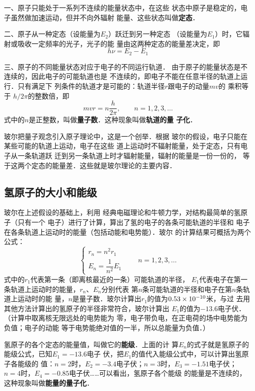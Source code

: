 一、原子只能处于一系列不连续的能量状态中，在这些
状态中原子是稳定的，电子虽然做加速运动，但并不向外辐射
能量、这些状态叫做\textbf{定态}．

二、原子从一种定态（设能量为$E_2$）跃迁到另一种定态
（设能量为$E_1$）时，它辐射或吸收一定频率的光子，光子的能
量由这两种定态的能量差决定，即
\[h\nu=E_2-E_1\]

三、原子的不同能量状态对应于电子的不同运行轨道．
由于原子的能量状态是不连续的，因此电子的可能轨道也是
不连续的，即电子不能在任意半径的轨道上运行．只有满足下
列条件的轨道才是可能的：轨道半径$r$跟电子的动量$mv$的
乘积等于 $h/2\pi$的整数倍，即
\[mvr=n\frac{h}{2\pi},\qquad n=1,2,3,\ldots\]
式中的$n$是正整数，叫做\textbf{量子数}．这种现象叫做\textbf{轨道的量
子化}．

玻尔把量子观念引入原子理论中，这是一个创举．根据
玻尔的假设，电子只能在某些可能的轨道上运动，电子在这些
道上运动时不辐射能量，处于定态，只有电子从一条轨道跃
迁到另一条轨道上时才辐射能量，辐射的能量是一份一份的，
等于这两个定态的能量差．这些就是玻尔理论的主要内容．

\subsection{氢原子的大小和能级}

玻尔在上述假设的基础上，利用
经典电磁理论和牛顿力学，对结构最简单的氢原子（只有一个
电子）进行了计算，算出了氢的电子的各条可能轨道的半径和
电子在各条轨道上运动时的能量（包括动能和电势能）．玻尔
的计算结果可概括为两个公式：
\[\begin{cases}
    r_n=n^2 r_1\\
    E_n=\dfrac{1}{n^2}E_1
\end{cases}\qquad n=1,2,3,\ldots\]
式中的$r_1$代表第一条（即离核最近的一条）可能轨道的半径，
$E_1$代表电子在第一条轨道上运动时的能量，$r_n$、$E_n$分别代表
第$n$条可能轨道的半径和电子在第$n$条轨道上运动时的能
量，$n$是量子数．玻尔计算出$r_1$的值为$0.53\times10^{-10}$米，与过
去用其他方法计算出的氢原子的半径非常符合，玻尔计算出
$E_1$的值为$-13.6$电子伏．（计算中取离核无限远处的电势能为
零，电子带负电，在正电荷的场中电势能为负值；电子的动能
等于电势能绝对值的一半，所以总能量为负值．）

氢原子的各个定态的能量值，叫做它的\textbf{能级}．上面的计
算$E_n$的式子就是氢原子的能级公式，已知$E_1=-13.6$电子
伏，把$E_1$的值代入能级公式中，可以计算出氢原子各能级的
值：$n=2$时，$E_2=-3.4$电子伏；$n=3$时，$E_3=-1.51$电子伏；
$n=4$时，$E_4=-0.85$电子伏……可以看出，氢原子各个能级
的能量是不连续的，这种现象叫做\textbf{能量的量子化}．


